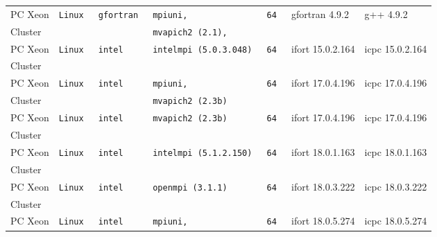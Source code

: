 \begin{longtable}{lllllll}
PC Xeon        &\tt Linux  &\tt gfortran     &\tt mpiuni,   &\tt 64             & gfortran \footnotesize 4.9.2        & g++ \footnotesize 4.9.2                \\
Cluster        &           &                 &\tt mvapich2 \footnotesize (2.1),  &                 &                                     &                     \\
PC Xeon        &\tt Linux  &\tt intel        &\tt intelmpi \footnotesize (5.0.3.048) &\tt 64 & ifort \footnotesize 15.0.2.164 & icpc \footnotesize 15.0.2.164  \\
Cluster        &           &                 &                     &                 &                                     &                                   \\
PC Xeon        &\tt Linux  &\tt intel        &\tt mpiuni,  &\tt 64           & ifort \footnotesize 17.0.4.196      & icpc \footnotesize 17.0.4.196             \\
Cluster        &           &                 &\tt mvapich2 \footnotesize (2.3b)  &                 &                                     &                     \\
PC Xeon        &\tt Linux  &\tt intel        &\tt mvapich2 \footnotesize (2.3b)  &\tt 64 & ifort \footnotesize 17.0.4.196  & icpc \footnotesize 17.0.4.196     \\
Cluster        &           &                 &                     &                 &                                     &                                   \\
PC Xeon        &\tt Linux  &\tt intel        &\tt intelmpi \footnotesize (5.1.2.150) &\tt 64 & ifort \footnotesize 18.0.1.163  & icpc \footnotesize 18.0.1.163 \\
Cluster        &           &                 &                     &                 &                                     &                                   \\
PC Xeon        &\tt Linux  &\tt intel        &\tt openmpi \footnotesize (3.1.1)  &\tt 64 & ifort \footnotesize 18.0.3.222  & icpc \footnotesize 18.0.3.222     \\
Cluster        &           &                 &                     &                 &                                     &                                   \\
PC Xeon        &\tt Linux  &\tt intel        &\tt mpiuni,           &\tt 64           & ifort \footnotesize 18.0.5.274     & icpc \footnotesize 18.0.5.274     \\

\end{longtable}
